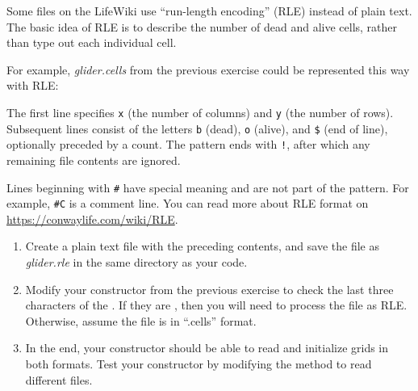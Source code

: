 \begin{exercise}
Some files on the LifeWiki use ``run-length encoding'' (RLE) instead of plain text.
The basic idea of RLE is to describe the number of dead and alive cells, rather than type out each individual cell.

For example, {\it glider.cells} from the previous exercise could be represented this way with RLE:


The first line specifies \verb|x| (the number of columns) and \verb|y| (the number of rows).
Subsequent lines consist of the letters \verb|b| (dead), \verb|o| (alive), and \verb|$| (end of line), optionally preceded by a count.
The pattern ends with \verb|!|, after which any remaining file contents are ignored.

Lines beginning with \verb|#| have special meaning and are not part of the pattern.
For example, \verb|#C| is a comment line.
You can read more about RLE format on \url{https://conwaylife.com/wiki/RLE}.

\begin{enumerate}

\item Create a plain text file with the preceding contents, and save the file as {\it glider.rle} in the same directory as your code.


\item Modify your constructor from the previous exercise to check the last three characters of the .
If they are , then you will need to process the file as RLE.
Otherwise, assume the file is in ``.cells'' format.

\item In the end, your constructor should be able to read and initialize grids in both formats.
Test your constructor by modifying the  method to read different files.

\end{enumerate}

\end{exercise}
